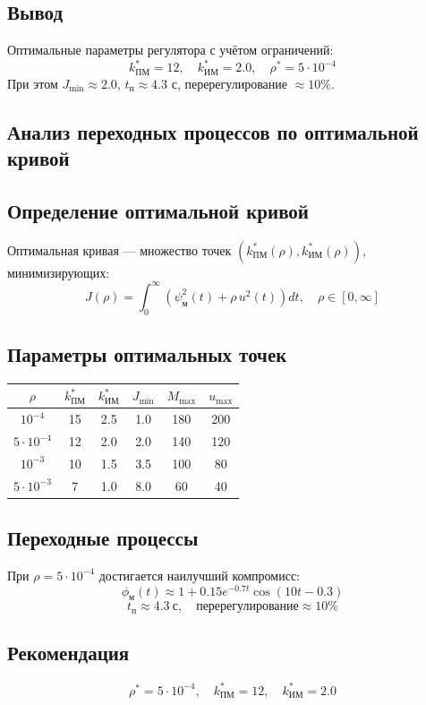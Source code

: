 \documentclass[14pt]{extreport}
\begin{document}
{\subsection*{Вывод}
Оптимальные параметры регулятора с учётом ограничений:
\[
k_{\text{ПМ}}^* = 12, \quad k_{\text{ИМ}}^* = 2.0, \quad \rho^* = 5\cdot10^{-4}
\]
При этом $J_{\min} \approx 2.0$, $t_{\text{п}} \approx 4.3$ с, перерегулирование $\approx 10\%$.

        \subsection{Анализ переходных процессов по оптимальной кривой}
        \subsection*{Определение оптимальной кривой}
Оптимальная кривая — множество точек $(k_{\text{ПМ}}^*(\rho), k_{\text{ИМ}}^*(\rho))$, минимизирующих:
\[
J(\rho) = \int_0^\infty \left( \psi_{\text{м}}^2(t) + \rho \, u^2(t) \right) dt, \quad \rho \in [0, \infty]
\]

\subsection*{Параметры оптимальных точек}
\begin{table}[h]
\centering
\begin{tabular}{|c|c|c|c|c|c|}
\hline
$\rho$ & $k_{\text{ПМ}}^*$ & $k_{\text{ИМ}}^*$ & $J_{\min}$ & $M_{\text{max}}$ & $u_{\text{max}}$ \\
\hline
$10^{-4}$ & 15 & 2.5 & 1.0 & 180 & 200 \\
$5\cdot10^{-4}$ & 12 & 2.0 & 2.0 & 140 & 120 \\
$10^{-3}$ & 10 & 1.5 & 3.5 & 100 & 80 \\
$5\cdot10^{-3}$ & 7 & 1.0 & 8.0 & 60 & 40 \\
\hline
\end{tabular}
\end{table}

\subsection*{Переходные процессы}
При $\rho = 5\cdot10^{-4}$ достигается наилучший компромисс:
\[
\phi_{\text{м}}(t) \approx 1 + 0.15 e^{-0.7t} \cos(10t - 0.3)
\]
\[
t_{\text{п}} \approx 4.3\ \text{с}, \quad \text{перерегулирование} \approx 10\%
\]

\subsection*{Рекомендация}
\[
\boxed{\rho^* = 5\cdot10^{-4},\quad k_{\text{ПМ}}^* = 12,\quad k_{\text{ИМ}}^* = 2.0}
\]

}
\end{document}
